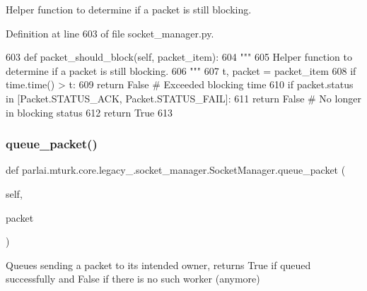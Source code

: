 \begin{DoxyVerb}Helper function to determine if a packet is still blocking.
\end{DoxyVerb}
 

Definition at line 603 of file socket\+\_\+manager.\+py.


\begin{DoxyCode}
603     \textcolor{keyword}{def }packet\_should\_block(self, packet\_item):
604         \textcolor{stringliteral}{"""}
605 \textcolor{stringliteral}{        Helper function to determine if a packet is still blocking.}
606 \textcolor{stringliteral}{        """}
607         t, packet = packet\_item
608         \textcolor{keywordflow}{if} time.time() > t:
609             \textcolor{keywordflow}{return} \textcolor{keyword}{False}  \textcolor{comment}{# Exceeded blocking time}
610         \textcolor{keywordflow}{if} packet.status \textcolor{keywordflow}{in} [Packet.STATUS\_ACK, Packet.STATUS\_FAIL]:
611             \textcolor{keywordflow}{return} \textcolor{keyword}{False}  \textcolor{comment}{# No longer in blocking status}
612         \textcolor{keywordflow}{return} \textcolor{keyword}{True}
613 
\end{DoxyCode}
\mbox{\label{classparlai_1_1mturk_1_1core_1_1legacy__2018_1_1socket__manager_1_1SocketManager_a806197fb2a39b170bdc10f93f010318c}} 
\subsubsection{\texorpdfstring{queue\+\_\+packet()}{queue\_packet()}}
{\footnotesize\ttfamily def parlai.\+mturk.\+core.\+legacy\+\_.\+socket\+\_\+manager.\+Socket\+Manager.\+queue\+\_\+packet (\begin{DoxyParamCaption}\item[{}]{self,  }\item[{}]{packet }\end{DoxyParamCaption})}

\begin{DoxyVerb}Queues sending a packet to its intended owner, returns True if queued
successfully and False if there is no such worker (anymore)
\end{DoxyVerb}
 

